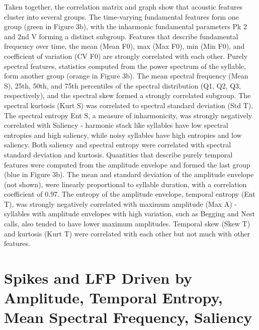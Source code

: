 Taken together, the correlation matrix and graph show that acoustic features cluster into several groups. The time-varying fundamental features form one group (green in Figure 3b), with the inharmonic fundamental parameters Pk 2 and 2nd V forming a distinct subgroup. Features that describe fundamental frequency over time, the mean (Mean F0), max (Max F0), min (Min F0), and coefficient of variation (CV F0) are strongly correlated with each other. Purely spectral features, statistics computed from the power spectrum of the syllable, form another group (orange in Figure 3b). The mean spectral frequency (Mean S), 25th, 50th, and 75th percentiles of the spectral distribution (Q1, Q2, Q3, respectively), and the spectral skew formed a strongly correlated subgroup. The spectral kurtosis (Kurt S) was correlated to spectral standard deviation (Std T). The spectral entropy Ent S, a measure of inharmonicity, was strongly negatively correlated with Saliency - harmonic stack like syllables have low spectral entropies and high saliency, while noisy syllables have high entropies and low saliency. Both saliency and spectral entropy were correlated with spectral standard deviation and kurtosis. Quantities that describe purely temporal features were computed from the amplitude envelope and formed the last group (blue in Figure 3b). The mean and standard deviation of the amplitude envelope (not shown), were linearly proportional to syllable duration, with a correlation coefficient of 0.97. The entropy of the amplitude envelope, temporal entropy (Ent T), was strongly negatively correlated with maximum amplitude (Max A) - syllables with amplitude envelopes with high variation, such as Begging and Nest calls, also tended to have lower maximum amplitudes. Temporal skew (Skew T) and kurtosis (Kurt T) were correlated with each other but not much with other features.

\section{Spikes and LFP Driven by Amplitude, Temporal Entropy, Mean Spectral Frequency, Saliency}

